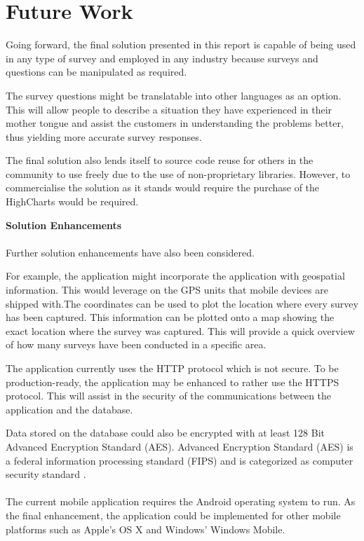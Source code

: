 \documentclass[12pt]{witseiepaper}
\begin{document}
\section{Future Work}
Going forward, the final solution presented in this report is capable of being used in any type of survey and employed in any industry because surveys and questions can be manipulated as required.

The survey questions might be translatable into other languages as an option. This will allow people to describe a situation they have experienced in their mother tongue and assist the customers in understanding the problems better, thus yielding more accurate survey responses.

The final solution also lends itself to source code reuse for others in the community to use freely due to the use of non-proprietary libraries. However, to commercialise the solution as it stands would require the purchase of the HighCharts would be required.

\textbf{Solution Enhancements}\\ \\
Further solution enhancements have also been considered.

For example, the application might incorporate the application with geospatial information. This would leverage on the GPS units that mobile devices are shipped with.The coordinates can be used to plot the location where every survey has been captured. This information can be plotted onto a map showing the exact location where the survey was captured. This will provide a quick overview of how many surveys have been conducted in a specific area.

The application currently uses the HTTP protocol which is not secure. To be production-ready, the application may be enhanced to rather use the HTTPS protocol. This will assist in the security of the communications between the application and the database.

Data stored on the database could also be encrypted with at least 128 Bit Advanced Encryption Standard (AES). Advanced Encryption Standard (AES) is a federal information processing standard (FIPS) and is categorized as computer security standard \cite{AES}. \\ \\
The current mobile application requires the Android operating system to run. As the final enhancement, the application could be implemented for other mobile platforms such as Apple's OS X and Windows' Windows Mobile.
\end{document}
